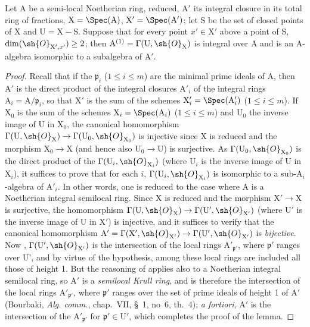 \begin{lemma}[18.9.7.5]
\label{IV.18.9.7.5}
Let $\mathrm{A}$ be a semi-local Noetherian ring, reduced, $\mathrm{A}'$ its integral closure in its total ring of fractions, $\mathrm{X}=\Spec(\mathrm{A})$, $\mathrm{X}'=\Spec(\mathrm{A}')$;
let S be the set of closed points of $\mathrm{X}$ and $\mathrm{U}=\mathrm{X}-\mathrm{S}$.
Suppose that for every point $x'\in\mathrm{X}'$ above a point of S, $\dim(\sh{O}_{\mathrm{X}',x'})\geq 2$;
then $\mathrm{A}^{(1)}=\Gamma(\mathrm{U},\sh{O}_{\mathrm{X}})$ is integral over $\mathrm{A}$ and is an A-algebra isomorphic to a subalgebra of $\mathrm{A}'$.
\end{lemma}

\begin{proof}
Recall that if the $\mathfrak{p}_i$ ($1\leq i\leq m$) are the minimal prime ideals of A, then $\mathrm{A}'$ is the direct product of the integral closures $\mathrm{A}'_i$ of the integral rings $\mathrm{A}_i=\mathrm{A}/\mathfrak{p}_i$, so that $\mathrm{X}'$ is the sum of the schemes $\mathrm{X}'_i=\Spec(\mathrm{A}'_i)$ ($1\leq i\leq m$).
If $\mathrm{X}_0$ is the sum of the schemes $\mathrm{X}_i=\Spec(\mathrm{A}_i)$ ($1\leq i\leq m$) and $\mathrm{U}_0$ the inverse image of U in $\mathrm{X}_0$, the canonical homomorphism $\Gamma(\mathrm{U},\sh{O}_{\mathrm{X}})\to\Gamma(\mathrm{U}_0,\sh{O}_{\mathrm{X}_0})$ is injective since X is reduced and the morphism $\mathrm{X}_0\to\mathrm{X}$ (and hence also $\mathrm{U}_0\to\mathrm{U}$) is surjective.
As $\Gamma(\mathrm{U}_0,\sh{O}_{\mathrm{X}_0})$ is the direct product of the $\Gamma(\mathrm{U}_i,\sh{O}_{\mathrm{X}_i})$ (where $\mathrm{U}_i$ is the inverse image of U in $\mathrm{X}_i$), it suffices to prove that for each $i$, $\Gamma(\mathrm{U}_i,\sh{O}_{\mathrm{X}_i})$ is isomorphic to a sub-$\mathrm{A}_i$-algebra of $\mathrm{A}'_i$.
In other words, one is reduced to the case where A is a Noetherian integral semilocal ring.
Since X is reduced and the morphism $\mathrm{X}'\to\mathrm{X}$ is surjective, the homomorphism $\Gamma(\mathrm{U},\sh{O}_{\mathrm{X}})\to\Gamma(\mathrm{U}',\sh{O}_{\mathrm{X}'})$ (where $\mathrm{U}'$ is the inverse image of U in $\mathrm{X}'$) is injective, and it suffices to verify that the canonical homomorphism $\mathrm{A}'=\Gamma(\mathrm{X}',\sh{O}_{\mathrm{X}'})\to\Gamma(\mathrm{U}',\sh{O}_{\mathrm{X}'})$ is \emph{bijective}.
Now , $\Gamma(\mathrm{U}',\sh{O}_{\mathrm{X}'})$ is the intersection of the local rings $\mathrm{A}'_{\mathfrak{p}'}$, where $\mathfrak{p}'$ ranges over U', and by virtue of the hypothesis, among these local rings are included all those of height 1.
But the reasoning of  applies also to a Noetherian integral semilocal ring, so $\mathrm{A}'$ is a \emph{semilocal Krull ring}, and is therefore the intersection of the local rings $\mathrm{A}'_{\mathfrak{p}'}$, where $\mathfrak{p}'$ ranges over the set of prime ideals of height 1 of $\mathrm{A}'$ (Bourbaki, \emph{Alg. comm.}, chap.~VII, \S~1, no~6, th.~4);
\emph{a fortiori}, $\mathrm{A}'$ is the intersection of the $\mathrm{A}'_{\mathfrak{p}'}$ for $\mathfrak{p}'\in\mathrm{U}'$, which completes the proof of the lemma.
\end{proof}

